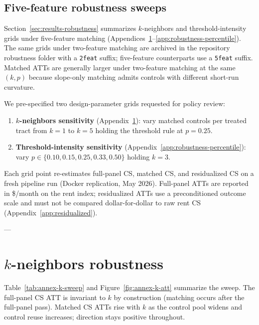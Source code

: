 \subsection{Five-feature robustness sweeps}\label{app:matching-robustness}

Section~\ref{sec:results-robustness} summarizes $k$-neighbors and threshold-intensity grids under five-feature matching (Appendices~\ref{app:robustness-k}--\ref{app:robustness-percentile}).
The same grids under two-feature matching are archived in the repository robustness folder with a \texttt{2feat} suffix; five-feature counterparts use a \texttt{5feat} suffix.
Matched ATTs are generally larger under two-feature matching at the same $(k,p)$ because slope-only matching admits controls with different short-run curvature.

We pre-specified two design-parameter grids requested for policy review:
\begin{enumerate}
  \item \textbf{$k$-neighbors sensitivity} (Appendix~\ref{app:robustness-k}): vary matched controls per treated tract from $k=1$ to $k=5$ holding the threshold rule at $p=0.25$.
  \item \textbf{Threshold-intensity sensitivity} (Appendix~\ref{app:robustness-percentile}): vary $p\in\{0.10,0.15,0.25,0.33,0.50\}$ holding $k=3$.
\end{enumerate}

Each grid point re-estimates full-panel CS, matched CS, and residualized CS on a fresh pipeline run (Docker replication, May 2026).
Full-panel ATTs are reported in \$/month on the rent index; residualized ATTs use a preconditioned outcome scale and must not be compared dollar-for-dollar to raw rent CS (Appendix~\ref{app:residualized}).

---

\section{$k$-neighbors robustness}\label{app:robustness-k}

Table~\ref{tab:annex-k-sweep} and Figure~\ref{fig:annex-k-att} summarize the sweep.
The full-panel CS ATT is invariant to $k$ by construction (matching occurs after the full-panel pass).
Matched CS ATTs rise with $k$ as the control pool widens and control reuse increases; direction stays positive throughout.

